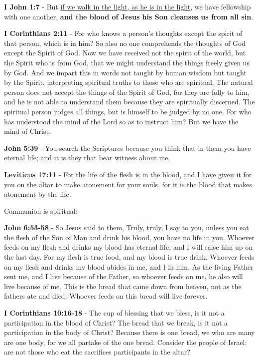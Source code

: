 \documentclass[11pt]{article}
\begin{document}
\textbf{I John 1:7} - But \uline{if we walk in the light, as he is in the light}, we have fellowship with one another, \textbf{and the blood of Jesus his Son cleanses us from all sin}.

\textbf{I Corinthians 2:11} - For who knows a person's thoughts except the spirit of that person, which is in him? So also no one comprehends the thoughts of God except the Spirit of God. Now we have received not the spirit of the world, but the Spirit who is from God, that we might understand the things freely given us by God. And we impart this in words not taught by human wisdom but taught by the Spirit, interpreting spiritual truths to those who are spiritual. The natural person does not accept the things of the Spirit of God, for they are folly to him, and he is not able to understand them because they are spiritually discerned. The spiritual person judges all things, but is himself to be judged by no one. For who has understood the mind of the Lord so as to instruct him? But we have the mind of Christ.

\textbf{John 5:39} - You search the Scriptures because you think that in them you have eternal life; and it is they that bear witness about me,

\textbf{Leviticus 17:11} - For the life of the flesh is in the blood, and I have given it for you on the altar to make atonement for your souls, for it is the blood that makes atonement by the life.

Communion is spiritual:

\textbf{John 6:53-58} - So Jesus said to them, Truly, truly, I say to you, unless you eat the flesh of the Son of Man and drink his blood, you have no life in you.  Whoever feeds on my flesh and drinks my blood has eternal life, and I will raise him up on the last day.  For my flesh is true food, and my blood is true drink.  Whoever feeds on my flesh and drinks my blood abides in me, and I in him.  As the living Father sent me, and I live because of the Father, so whoever feeds on me, he also will live because of me.  This is the bread that came down from heaven, not as the fathers ate and died. Whoever feeds on this bread will live forever.

\textbf{I Corinthians 10:16-18} - The cup of blessing that we bless, is it not a participation in the blood of Christ? The bread that we break, is it not a participation in the body of Christ? Because there is one bread, we who are many are one body, for we all partake of the one bread. Consider the people of Israel: are not those who eat the sacrifices participants in the altar?
\end{document}

